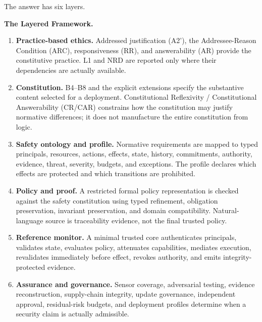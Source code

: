 \documentclass[11pt]{article}
\def\ensuremath#1{#1}%
\def\mathrm#1{#1}%
\newcommand{\Atwo}{\texorpdfstring{\ensuremath{\mathrm{A2}'}}{A2'}}
\begin{document}
The answer has six layers.
\begin{paperbox}
\textbf{The Layered Framework.}
\begin{enumerate}[label=(\Roman*)]
\item \textbf{Practice-based ethics.} Addressed justification (\Atwo{}), the Addressee-Reason Condition (ARC), responsiveness (RR), and answerability (AR) provide the constitutive practice. L1 and NRD are reported only where their dependencies are actually available.
\item \textbf{Constitution.} B4--B8 and the explicit extensions specify the substantive content selected for a deployment. Constitutional Reflexivity / Constitutional Answerability (CR/CAR) constrains how the constitution may justify normative differences; it does not manufacture the entire constitution from logic.
\item \textbf{Safety ontology and profile.} Normative requirements are mapped to typed principals, resources, actions, effects, state, history, commitments, authority, evidence, threat, severity, budgets, and exceptions. The profile declares which effects are protected and which transitions are prohibited.
\item \textbf{Policy and proof.} A restricted formal policy representation is checked against the safety constitution using typed refinement, obligation preservation, invariant preservation, and domain compatibility. Natural-language source is traceability evidence, not the final trusted policy.
\item \textbf{Reference monitor.} A minimal trusted core authenticates principals, validates state, evaluates policy, attenuates capabilities, mediates execution, revalidates immediately before effect, revokes authority, and emits integrity-protected evidence.
\item \textbf{Assurance and governance.} Sensor coverage, adversarial testing, evidence reconstruction, supply-chain integrity, update governance, independent approval, residual-risk budgets, and deployment profiles determine when a security claim is actually admissible.
\end{enumerate}
\end{paperbox}
\end{document}
